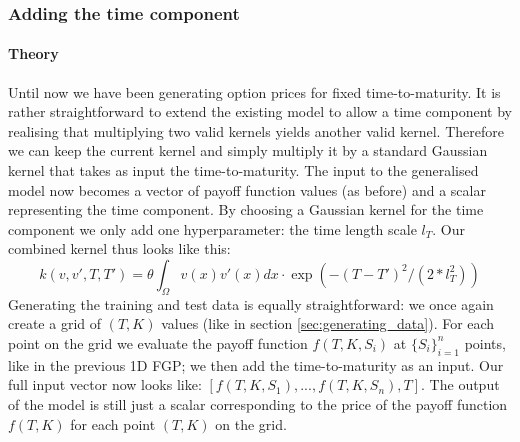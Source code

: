 \documentclass[a4paper,12pt]{article}
\begin{document}
\subsubsection{Adding the time component}
\paragraph{Theory}
Until now we have been generating option prices for fixed time-to-maturity. It is rather straightforward to extend the existing model to allow a time component by realising that multiplying two valid kernels yields another valid kernel. Therefore we can keep the current kernel and simply multiply it by a standard Gaussian kernel that takes as input the time-to-maturity. The input to the generalised model now becomes a vector of payoff function values (as before) and a scalar representing the time component. By choosing a Gaussian kernel for the time component we only add one hyperparameter: the time length scale $l_T$. Our combined kernel thus looks like this:
\begin{equation}
    k(v, v', T, T') = \theta \int_\Omega v(x) v'(x) dx \cdot \exp \left( -(T-T')^2/(2*l_T^2) \right)
\end{equation}
Generating the training and test data is equally straightforward: we once again create a grid of $(T, K)$ values (like in section \ref{sec:generating_data}). For each point on the grid we evaluate the payoff function $f(T,K,S_i)$ at $\{S_i\}_{i=1}^n$ points, like in the previous 1D FGP; we then add the time-to-maturity as an input. Our full input vector now looks like: $[f(T,K,S_1), ..., f(T,K,S_n), T]$. The output of the model is still just a scalar corresponding to the price of the payoff function $f(T,K)$ for each point $(T, K)$ on the grid.
\end{document}
